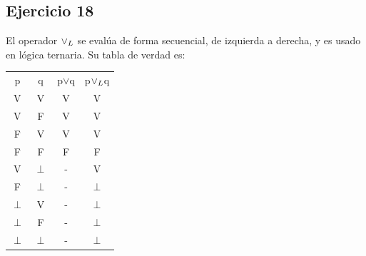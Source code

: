 	\subsection{Ejercicio 18}
		El operador $\lor _L$ se evalúa de forma secuencial, de izquierda a derecha, y es usado en lógica ternaria. Su tabla de verdad es:\\
		\begin{tabular}{c|c|c|c}
			p & q & p$\vee$q & p$\lor _L$q\\
			V & V & V & V\\
			V & F & V & V\\
			F & V & V & V\\
			F & F & F & F\\
			V & $\perp$ & - & V\\
			F & $\perp$ & - & $\perp$\\
			$\perp$ & V & - & $\perp$\\
			$\perp$ & F & - & $\perp$\\
			$\perp$ & $\perp$ & - & $\perp$\\
		\end{tabular}	

